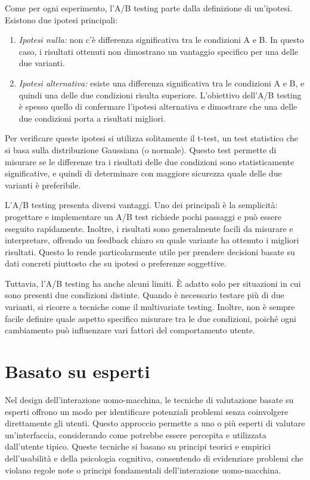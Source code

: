 Come per ogni esperimento, l’A/B testing parte dalla definizione di un’ipotesi. Esistono due ipotesi principali:
\begin{enumerate}
    \item \textit{Ipotesi nulla:} non c’è differenza significativa tra le condizioni A e B. In questo caso, i risultati ottenuti non dimostrano un vantaggio specifico per una delle due varianti.
    \item \textit{Ipotesi alternativa:} esiste una differenza significativa tra le condizioni A e B, e quindi una delle due condizioni risulta superiore. L’obiettivo dell’A/B testing è spesso quello di confermare l'ipotesi alternativa e dimostrare che una delle due condizioni porta a risultati migliori.
\end{enumerate}
Per verificare queste ipotesi si utilizza solitamente il t-test, un test statistico che si basa sulla distribuzione Gaussiana (o normale). Questo test permette di misurare se le differenze tra i risultati delle due condizioni sono statisticamente significative, e quindi di determinare con maggiore sicurezza quale delle due varianti è preferibile.

L’A/B testing presenta diversi vantaggi. Uno dei principali è la semplicità: progettare e implementare un A/B test richiede pochi passaggi e può essere eseguito rapidamente. Inoltre, i risultati sono generalmente facili da misurare e interpretare, offrendo un feedback chiaro su quale variante ha ottenuto i migliori risultati. Questo lo rende particolarmente utile per prendere decisioni basate su dati concreti piuttosto che su ipotesi o preferenze soggettive.

Tuttavia, l’A/B testing ha anche alcuni limiti. È adatto solo per situazioni in cui sono presenti due condizioni distinte. Quando è necessario testare più di due varianti, si ricorre a tecniche come il multivariate testing. Inoltre, non è sempre facile definire quale aspetto specifico misurare tra le due condizioni, poiché ogni cambiamento può influenzare vari fattori del comportamento utente.

\section{Basato su esperti}
Nel design dell'interazione uomo-macchina, le tecniche di valutazione basate su esperti offrono un modo per identificare potenziali problemi senza coinvolgere direttamente gli utenti. Questo approccio permette a uno o più esperti di valutare un’interfaccia, considerando come potrebbe essere percepita e utilizzata dall’utente tipico. Queste tecniche si basano su principi teorici e empirici dell’usabilità e della psicologia cognitiva, consentendo di evidenziare problemi che violano regole note o principi fondamentali dell'interazione uomo-macchina.

